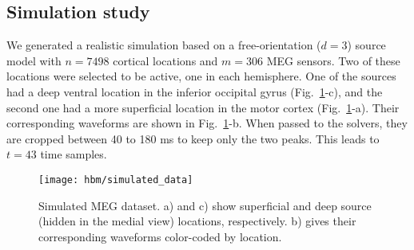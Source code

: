 \subsection{Simulation study}
We generated a realistic simulation based on a free-orientation ($d=3$) source model with $n=7498$ cortical locations and $m=306$ MEG sensors. Two of these locations were selected to be active, one in each hemisphere. One of the sources had a deep ventral location in the inferior occipital gyrus (Fig.~\ref{fig:simulated_data}-c), and the second one had a more superficial location in the motor cortex (Fig.~\ref{fig:simulated_data}-a). Their corresponding waveforms are shown in Fig.~\ref{fig:simulated_data}-b. When passed to the solvers, they are cropped between 40 to 180 ms to keep only the two peaks. This leads to $t=43$ time samples.

\begin{figure}[htp]
	\centering
	\texttt{[image: hbm/simulated\_data]}%

	\caption{Simulated MEG dataset. a) and c) show superficial and deep source (hidden in the medial view) locations, respectively. b) gives their corresponding waveforms color-coded by location.}
	\label{fig:simulated_data}
\end{figure}

